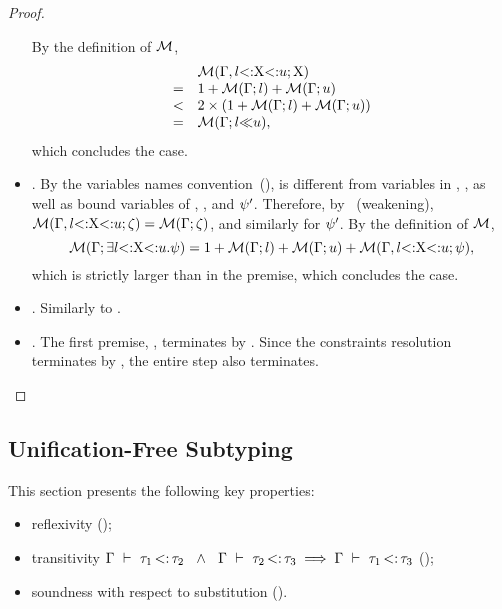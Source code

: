 \begin{proof}
\begin{itemize}
            By the definition of $\operatorname{\mathcal{M}}$,
            \[
                \begin{array}{cl}
                    & \operatorname{\mathcal{M}}(\Gamma, l{\operatorname{<:}}\mathrm{X}{\operatorname{<:}}u;\mathrm{X}) \\
                  = & 1 + \operatorname{\mathcal{M}}(\Gamma;l) + \operatorname{\mathcal{M}}(\Gamma;u) \\
                  < & 2\times(1 + \operatorname{\mathcal{M}}(\Gamma;l) + \operatorname{\mathcal{M}}(\Gamma;u)) \\
                  = & \operatorname{\mathcal{M}}(\Gamma;l{\operatorname{\ll}}u),
                \end{array}
            \]
            which concludes the case.
        \item {}. By the variables names
            convention~(), \vx is different from variables
            in \AEnv, \UEnv, as well as bound variables of \dctxsig, \tysig,
            and $\psi'$. Therefore, by~ (weakening),
            $\operatorname{\mathcal{M}}(\Gamma, l{\operatorname{<:}}\mathrm{X}{\operatorname{<:}}u;\zeta) = 
            \operatorname{\mathcal{M}}(\Gamma;\zeta)$, and similarly for $\psi'$.
            By the definition of $\operatorname{\mathcal{M}}$,
            \[\operatorname{\mathcal{M}}(\Gamma;\exists l{\operatorname{<:}}\mathrm{X}{\operatorname{<:}}u.\psi) = 1 +
                \operatorname{\mathcal{M}}(\Gamma;l) + \operatorname{\mathcal{M}}(\Gamma;u) + 
                \operatorname{\mathcal{M}}(\Gamma, l{\operatorname{<:}}\mathrm{X}{\operatorname{<:}}u;\psi),\]
            which is strictly larger than
            \tymsr{\AEnv, \varbound{\vx}{\tylb}{\tyub}}{\tysig} in the premise,
            which concludes the case.
        \item {}. Similarly to .
        \item {}. The first premise,
            ,
            terminates by .
            Since the constraints resolution \solvectrdflt terminates
            by , the entire step also terminates.
    \end{itemize}
\end{proof}


\subsection{Unification-Free Subtyping}%
\label{subsec:props-subty-proof}

This section presents the following key properties:
\begin{itemize}
    \item reflexivity \subtydflt{\ty}{\ty} ();
    \item transitivity $\subtydflt{\ty_1}{\ty_2} \ \ \land\ \ 
        \subtydflt{\ty_2}{\ty_3} \implies \subtydflt{\ty_1}{\ty_3}$
        (\thmref{thm:sub-ty-trans});
    \item soundness with respect to substitution ().
\end{itemize}

